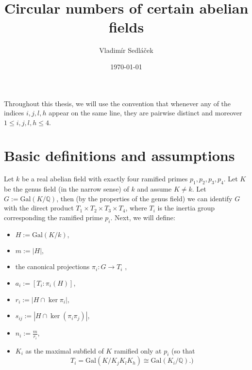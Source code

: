 \documentclass[12pt,a4paper]{article}
\newcommand{\Q}{\mathbb{Q}}
\newcommand{\Gal}{\mathrm{Gal}}
\begin{document}
\addtolength{\topmargin}{-30 pt}                   %
\setlength{\headsep}{10 pt}                      %
\renewcommand{\headrulewidth}{1 pt}                %

\title{Circular numbers of certain abelian fields}
\author{Vladimír Sedláček}
\date{\today}
\maketitle

Throughout this thesis, we will use the convention that whenever any of the indices $i,j,l,h$ appear on the same line, they are pairwise distinct and moreover $1\leq i,j,l,h\leq 4$.

\section{Basic definitions and assumptions}
Let $k$ be a real abelian field with exactly four ramified primes $p_1,p_2,p_3,p_4$. Let $K$ be the genus field (in the narrow sense) of $k$ and assume $K\neq k$. Let $G:=\Gal(K/\Q)$, then (by the properties of the genus field) we can identify $G$ with the direct product $T_1\times T_2\times T_3\times T_4$, where $T_i$ is the inertia group corresponding the ramified prime $p_i$. Next, we will define:

\begin{itemize}
\item $H:=\Gal(K/k)$, 
\item $m:=|H|,$
\item the canonical projections $\pi_i:G\to T_i$ ,
\item $a_i:=[T_i:\pi_i(H)]$,
\item $r_i:=|H\cap \ker \pi_i|$,
\item $s_{ij}:=|H\cap \ker (\pi_i\pi_j)|$,
\item $n_i:=\frac{m}{r_i}$,
\item $K_i$ as the maximal subfield of $K$ ramified only at $p_i$ (so that $$T_i=\Gal(K/K_jK_lK_h)\cong \Gal(K_i/\Q).)$$
\end{itemize}
\end{document}
